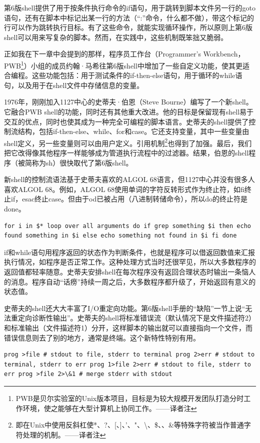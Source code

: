 \documentclass[a4paper,12pt,UTF8,twoside]{ctexbook}
\begin{document}
第6版shell提供了用于按条件执行命令的if语句，用于跳转到脚本文件另一行的goto语句，还有在脚本中标记出某一行的方法（“:”命令，什么都不做），带这个标记的行可以作为跳转执行目标。有了这些命令，就能实现循环操作，所以原则上第6版shell可以用来写复杂的脚本。然而，在实践中，这些机制既笨拙又脆弱。

正如我在下一章中会提到的那样，程序员工作台（Programmer’s Workbench，PWB\footnote{PWB是贝尔实验室的Unix版本项目，目标是为较大规模开发团队打造分时工作环境，使之能够在大型计算机上协同工作。——译者注}）小组的成员约翰·马希往第6版shell中增加了一些自定义功能，使其更适合编程。这些功能包括：用于测试条件的if-then-else语句，用于循环的while语句，以及用于在shell文件中存储信息的变量。

1976年，刚刚加入1127中心的史蒂夫·伯恩（Steve Bourne）编写了一个新shell。它融合PWB shell的功能，同时还有其他重大改进。他的目标是保留现有shell易于交互的优点，同时也使其成为一种完全可编程的脚本语言。史蒂夫的shell提供了控制流结构，包括if-then-else、while、for和case。它还支持变量，其中一些变量由shell定义，另一些变量则可以由用户定义。引用机制\footnote{即在Unix中使用反斜杠使*、?、[、]、'、"、\textbackslash、\$、\;、\&等特殊字符被当作普通字符处理的机制。——译者注}也得到了加强。最后，我们把它改得像其他程序一样能够成为管道执行流程中的过滤器。结果，伯恩的shell程序（被简称为sh）很快取代了第6版shell。

新shell的控制流语法基于史蒂夫喜欢的ALGOL 68语言，但1127中心并没有很多人喜欢ALGOL 68。例如，ALGOL 68使用单词的字符反转形式作为终止符，如fi终止if，esac终止case。但由于od已被占用（八进制转储命令），所以do的终止符是done。

\begin{lstlisting}
for i in $* loop over all arguments do if grep something $i then echo found something in $i else echo something not found in $i fi done
\end{lstlisting}

if和while语句用程序返回的状态作为判断条件，也就是程序可以借返回数值来汇报执行情况，如程序是否正常工作。这种处理方式当时还很罕见，所以大多数程序的返回值都轻率随意。史蒂夫安排shell在每次程序没有返回合理状态时输出一条恼人的消息。程序自动“话痨”持续一周之后，大多数程序都升级了，开始返回有意义的状态值。

史蒂夫的shell还大大丰富了I/O重定向功能。第6版shell手册的“缺陷”一节上说“无法重定向诊断性输出”。史蒂夫的shell将标准错误流（默认情况下是文件描述符2）和标准输出（文件描述符1）分开，这样脚本的输出就可以直接指向一个文件，而错误信息则去了别的地方，通常是终端。这个新特性特别有用。

\begin{lstlisting}
prog >file # stdout to file, stderr to terminal prog 2>err # stdout to terminal, stderr to err prog 1>file 2>err # stdout to file, stderr to err prog >file 2>\&1 # merge stderr with stdout
\end{lstlisting}
\end{document}
